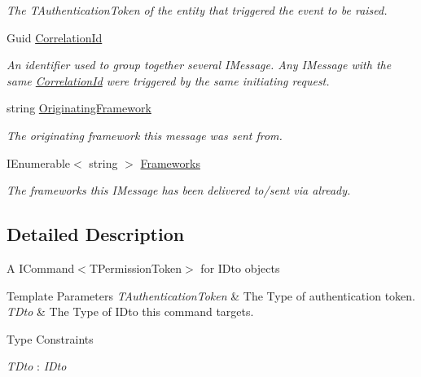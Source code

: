\begin{DoxyCompactItemize}
\begin{DoxyCompactList}\small\item\em The {\itshape T\+Authentication\+Token}  of the entity that triggered the event to be raised. \end{DoxyCompactList}\item 
Guid \hyperlink{classCqrs_1_1Commands_1_1DtoCommand_aeb60eb40f2a201fd63e846d728768cdf_aeb60eb40f2a201fd63e846d728768cdf}{Correlation\+Id}
\begin{DoxyCompactList}\small\item\em An identifier used to group together several I\+Message. Any I\+Message with the same \hyperlink{classCqrs_1_1Commands_1_1DtoCommand_aeb60eb40f2a201fd63e846d728768cdf_aeb60eb40f2a201fd63e846d728768cdf}{Correlation\+Id} were triggered by the same initiating request. \end{DoxyCompactList}\item 
string \hyperlink{classCqrs_1_1Commands_1_1DtoCommand_a7272fbc4acb35942a1c5fb22cd3a6b9b_a7272fbc4acb35942a1c5fb22cd3a6b9b}{Originating\+Framework}
\begin{DoxyCompactList}\small\item\em The originating framework this message was sent from. \end{DoxyCompactList}\item 
I\+Enumerable$<$ string $>$ \hyperlink{classCqrs_1_1Commands_1_1DtoCommand_a2df20833afc756e5f7d553e4ed28406e_a2df20833afc756e5f7d553e4ed28406e}{Frameworks}
\begin{DoxyCompactList}\small\item\em The frameworks this I\+Message has been delivered to/sent via already. \end{DoxyCompactList}\end{DoxyCompactItemize}


\subsection{Detailed Description}
A I\+Command$<$\+T\+Permission\+Token$>$ for I\+Dto objects 


\begin{DoxyTemplParams}{Template Parameters}
{\em T\+Authentication\+Token} & The Type of authentication token.\\
\hline
{\em T\+Dto} & The Type of I\+Dto this command targets.\\
\hline
\end{DoxyTemplParams}
\begin{Desc}
\item[Type Constraints]\begin{description}
\item[{\em T\+Dto} : {\em I\+Dto}]\end{description}
\end{Desc}


